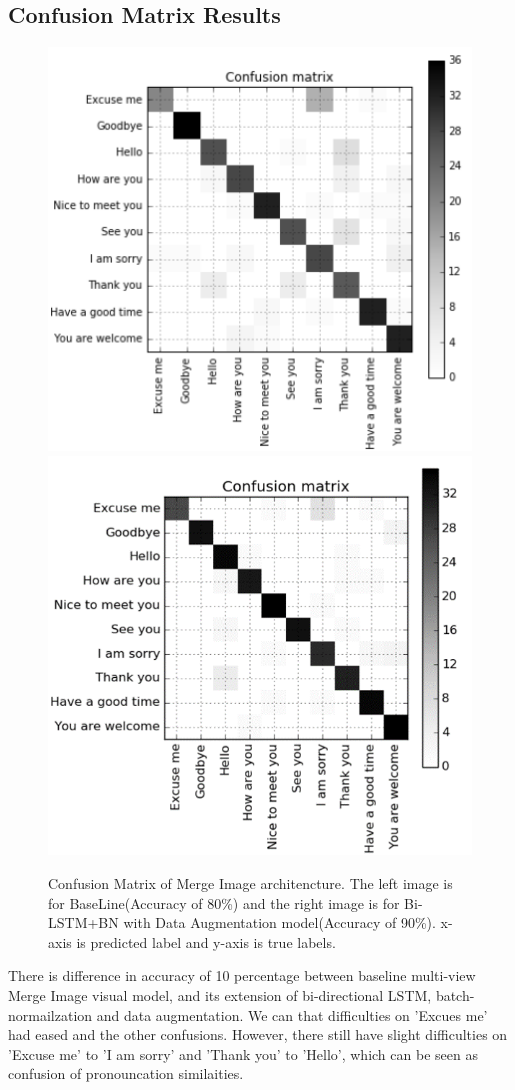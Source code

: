 \subsection{Confusion Matrix Results}
\begin{figure}[h]
	\centering
	\includegraphics[width=0.48\columnwidth]{fig/multi80MI.png}
	\includegraphics[width=0.5\columnwidth]{fig/multi90MI.png}
	\caption{Confusion Matrix of Merge Image architencture. The left image is for BaseLine(Accuracy of 80\%) and the right image is for Bi-LSTM+BN with Data Augmentation model(Accuracy of 90\%).  x-axis is predicted label and y-axis is true labels.}
	\label{fig:multi80MI}
\end{figure}
There is difference in accuracy of 10 percentage between baseline multi-view Merge Image visual model, and its extension of bi-directional LSTM, batch-normailzation and data augmentation. We can that difficulties on 'Excues me' had eased and the other confusions. However, there still have slight difficulties on 'Excuse me' to 'I am sorry' and 'Thank you' to 'Hello', which can be seen as confusion of pronouncation similaities.


